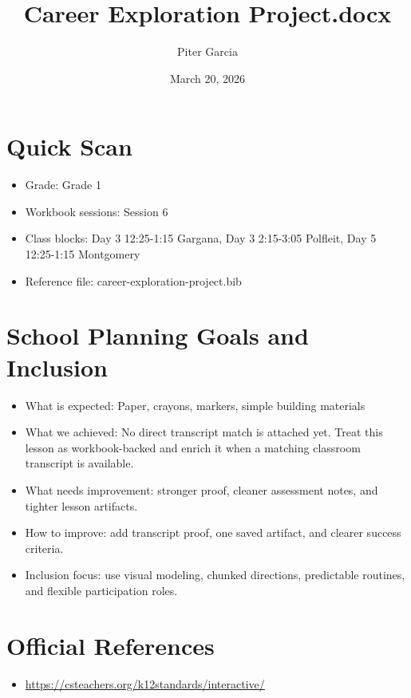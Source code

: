 \documentclass[11pt]{article}
\title{Career Exploration Project.docx}
\author{Piter Garcia}
\date{March 20, 2026}
\begin{document}
\maketitle
\section*{Quick Scan}
\begin{itemize}[leftmargin=*]
\item Grade: Grade 1
\item Workbook sessions: Session 6
\item Class blocks: Day 3 12:25-1:15 Gargana, Day 3 2:15-3:05 Polfleit, Day 5 12:25-1:15 Montgomery
\item Reference file: career-exploration-project.bib
\end{itemize}
\section*{School Planning Goals and Inclusion}
\begin{itemize}[leftmargin=*]
\item What is expected: Paper, crayons, markers, simple building materials
\item What we achieved: No direct transcript match is attached yet. Treat this lesson as workbook-backed and enrich it when a matching classroom transcript is available.
\item What needs improvement: stronger proof, cleaner assessment notes, and tighter lesson artifacts.
\item How to improve: add transcript proof, one saved artifact, and clearer success criteria.
\item Inclusion focus: use visual modeling, chunked directions, predictable routines, and flexible participation roles.
\end{itemize}
\section*{Official References}
\begin{itemize}[leftmargin=*]
\item \url{https://csteachers.org/k12standards/interactive/}

\end{itemize}
\end{document}

